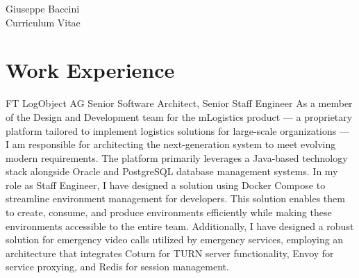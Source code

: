 \documentclass[10pt]{article} %
\begin{document}
\begin{paracol}{2} %


\parbox[top][0.12\textheight][c]{\linewidth}{ %
	\vspace{-0.04\textheight} %
	\centering %
	{\sffamily\Huge Giuseppe Baccini}\\\medskip %
	{\Huge\color{headings}\cvtextfont Curriculum Vitae}
}


\section{Work Experience}





{FT} %
{LogObject AG} %
{Senior Software Architect, Senior Staff Engineer} %
{As a member of the Design and Development team for the mLogistics product — a proprietary platform
tailored to implement logistics solutions for large-scale organizations — I am responsible for
architecting the next-generation system to meet evolving modern requirements.
The platform primarily leverages a Java-based technology stack alongside Oracle and PostgreSQL
database management systems.
In my role as Staff Engineer, I have designed a solution using Docker Compose to streamline environment
management for developers. This solution enables them to create, consume, and produce environments
efficiently while making these environments accessible to the entire team.
Additionally, I have designed a robust solution for emergency video calls utilized by emergency services,
employing an architecture that integrates Coturn for TURN server functionality, Envoy for service proxying,
and Redis for session management.}


\end{paracol}
\end{document}
